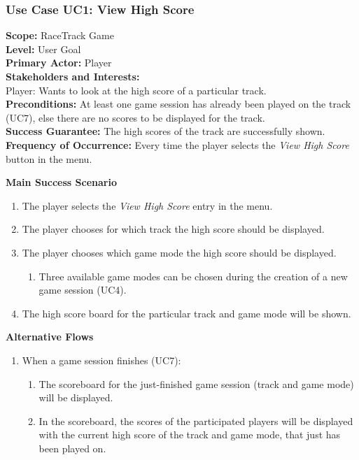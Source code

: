 		\subsubsection{Use Case UC1: View High Score}
			\textbf{Scope:} RaceTrack Game \\
			\textbf{Level:} User Goal \\
			\textbf{Primary Actor:} Player \\
			\textbf{Stakeholders and Interests:} \\
			Player: Wants to look at the high score of a particular track. \\
			\textbf{Preconditions:} At least one game session has already been played on the track (UC7), else there are no scores to be displayed for the track. \\
			\textbf{Success Guarantee:} The high scores of the track are successfully shown. \\
			\textbf{Frequency of Occurrence:} Every time the player selects the \textit{View High Score} button in the menu.
			\newline

			\textbf{Main Success Scenario}
				\begin{enumerate}
					\item The player selects the \textit{View High Score} entry in the menu.
					\item The player chooses for which track the high score should be displayed.
					\item The player chooses which game mode the high score should be displayed.
					\begin{enumerate}
						\item Three available game modes can be chosen during the creation of a new game session (UC4).
					\end{enumerate}
					\item The high score board for the particular track and game mode will be shown.
				\end{enumerate}

			\textbf{Alternative Flows}
				\begin{enumerate}
					\item When a game session finishes (UC7):
					\begin{enumerate}
						\item The scoreboard for the just-finished game session (track and game mode) will be displayed.
						\item In the scoreboard, the scores of the participated players will be displayed with the current high score of the track and game mode, that just has been played on.
					\end{enumerate}
				\end{enumerate}

